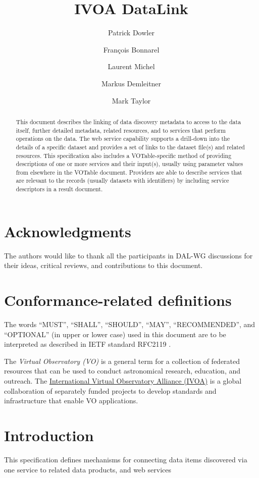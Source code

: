 \documentclass[11pt,a4paper]{ivoa}
\title{IVOA DataLink}
\author[http://www.ivoa.net/twiki/bin/view/IVOA/PatrickDowler]
       {Patrick Dowler}
\author[http://www.ivoa.net/twiki/bin/view/IVOA/FrancoisBonnarel]
       {Fran\c{c}ois Bonnarel}
\author[http://www.ivoa.net/twiki/bin/view/IVOA/LaurentMichel]
       {Laurent Michel}
\author[http://www.ivoa.net/twiki/bin/view/IVOA/MarkusDemleitner]
       {Markus Demleitner}
\author[http://www.ivoa.net/twiki/bin/view/IVOA/MarkTaylor]
       {Mark Taylor}
\begin{document}
\begin{abstract}
This document describes the linking of data discovery metadata
to access to the data itself, further detailed metadata, related
resources, and to services that perform operations on the data. The web
service capability supports a drill-down into the details of a specific
dataset and provides a set of links to the dataset file(s) and related
resources. This specification also includes a VOTable-specific method
of providing descriptions of one or more services and their input(s),
usually using parameter values from elsewhere in the VOTable document.
Providers are able to describe services that are relevant to the records
(usually datasets with identifiers) by including service descriptors in
a result document.
\end{abstract}


\section*{Acknowledgments}

The authors would like to thank all the participants in DAL-WG discussions
for their ideas, critical reviews, and contributions to this document.


\section*{Conformance-related definitions}

The words ``MUST'', ``SHALL'', ``SHOULD'', ``MAY'', ``RECOMMENDED'', and
``OPTIONAL'' (in upper or lower case) used in this document are to be
interpreted as described in IETF standard RFC2119 \citep{std:RFC2119}.

The \emph{Virtual Observatory (VO)} is a
general term for a collection of federated resources that can be used
to conduct astronomical research, education, and outreach.
The \href{http://www.ivoa.net}{International
Virtual Observatory Alliance (IVOA)} is a global
collaboration of separately funded projects to develop standards and
infrastructure that enable VO applications.


\section{Introduction}

This specification defines mechanisms for connecting data items
discovered via one service to  related data products, and web services
\end{document}
